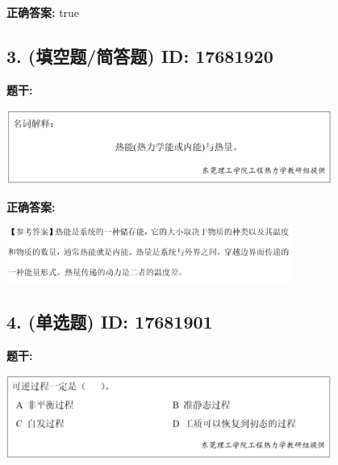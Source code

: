 \documentclass[12pt]{article}
\begin{document}
\textbf{正确答案:}
true

\vspace{0.5em}\hrulefill\vspace{1em}

\subsection*{3. (填空题/简答题) \small ID: 17681920}

\textbf{题干:}


\begin{center}\includegraphics[width=0.8\textwidth, height=0.25\textheight, keepaspectratio]{question_3_17681920/title_img_1.png}\end{center}

\textbf{正确答案:}

\begin{center}\includegraphics[width=0.7\textwidth, height=0.2\textheight, keepaspectratio]{question_3_17681920/correct_answer_1_img_1.png}\end{center}

\vspace{0.5em}\hrulefill\vspace{1em}

\subsection*{4. (单选题) \small ID: 17681901}

\textbf{题干:}


\begin{center}\includegraphics[width=0.8\textwidth, height=0.25\textheight, keepaspectratio]{question_4_17681901/title_img_1.png}\end{center}
\end{document}
